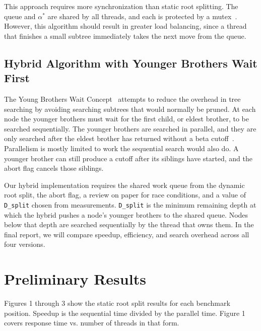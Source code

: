 \documentclass[10pt, conference, compsocconf]{IEEEtran}
\begin{document}
This approach requires more synchronization than static root splitting. The queue and $\alpha^{*}$ are shared by all threads, and each is protected by a mutex~\cite{posix1995}. However, this algorithm should result in greater load balancing, since a thread that finishes a small subtree immediately takes the next move from the queue.

\subsection*{Hybrid Algorithm with Younger Brothers Wait First}

The Young Brothers Wait Concept~\cite{feldmann1989} attempts to reduce the overhead in tree searching by avoiding searching subtrees that would normally be pruned. At each node the younger brothers must wait for the first child, or eldest brother, to be searched sequentially. The younger brothers are searched in parallel, and they are only searched after the eldest brother has returned without a beta cutoff~\cite{feldmann1989}. Parallelism is mostly limited to work the sequential search would also do. A younger brother can still produce a cutoff after its siblings have started, and the abort flag cancels those siblings.

Our hybrid implementation requires the shared work queue from the dynamic root split, the abort flag, a review on paper for race conditions, and a value of \texttt{D\_split} chosen from measurements. \texttt{D\_split} is the minimum remaining depth at which the hybrid pushes a node's younger brothers to the shared queue. Nodes below that depth are searched sequentially by the thread that owns them. In the final report, we will compare speedup, efficiency, and search overhead across all four versions.

\section{Preliminary Results}

Figures 1 through 3 show the static root split results for each benchmark position. Speedup is the sequential time divided by the parallel time. Figure 1 covers response time vs. number of threads in that form.

\begin{table}[H]
\caption{Mean time in seconds, sequential and static root split, depth 8, 5 runs}
\label{tab:times}
\centering
\footnotesize

\end{table}
\end{document}
